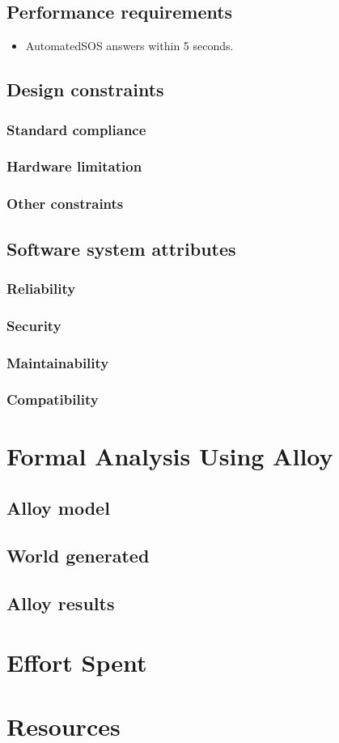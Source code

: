 \documentclass{article}
\begin{document}
\subsection{Performance requirements}
\begin{itemize}
	\item AutomatedSOS answers within 5 seconds.
\end{itemize}
\subsection{Design constraints}
\subsubsection{Standard compliance}
\subsubsection{Hardware limitation}
\subsubsection{Other constraints}
\subsection{Software system attributes}
\subsubsection{Reliability}
\subsubsection{Security}
\subsubsection{Maintainability}
\subsubsection{Compatibility}
\section{Formal Analysis Using Alloy}
\subsection{Alloy model}
\subsection{World generated}
\subsection{Alloy results}
\section{Effort Spent}
\section{Resources}
\end{document}
